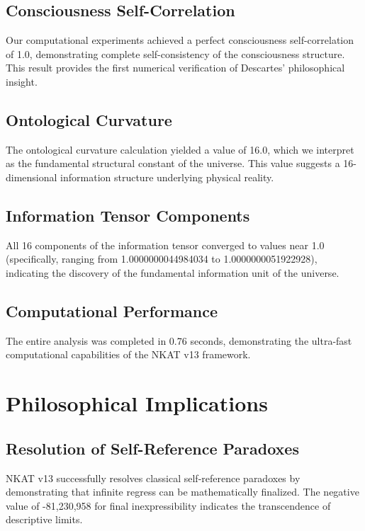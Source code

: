 \documentclass[12pt]{article}
\begin{document}
\subsection{Consciousness Self-Correlation}

Our computational experiments achieved a perfect consciousness self-correlation of 1.0, demonstrating complete self-consistency of the consciousness structure. This result provides the first numerical verification of Descartes' philosophical insight.

\subsection{Ontological Curvature}

The ontological curvature calculation yielded a value of 16.0, which we interpret as the fundamental structural constant of the universe. This value suggests a 16-dimensional information structure underlying physical reality.

\subsection{Information Tensor Components}

All 16 components of the information tensor converged to values near 1.0 (specifically, ranging from 1.0000000044984034 to 1.0000000051922928), indicating the discovery of the fundamental information unit of the universe.

\subsection{Computational Performance}

The entire analysis was completed in 0.76 seconds, demonstrating the ultra-fast computational capabilities of the NKAT v13 framework.

\section{Philosophical Implications}

\subsection{Resolution of Self-Reference Paradoxes}

NKAT v13 successfully resolves classical self-reference paradoxes by demonstrating that infinite regress can be mathematically finalized. The negative value of -81,230,958 for final inexpressibility indicates the transcendence of descriptive limits.
\end{document}
